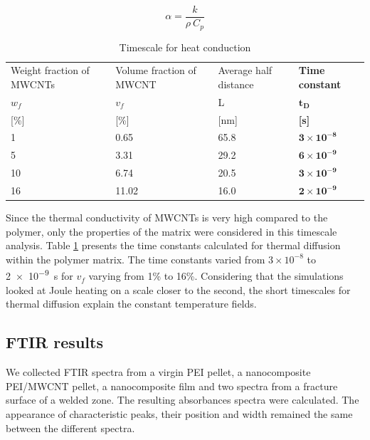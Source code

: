 \documentclass[11pt,review,times]{elsarticle}
\begin{document}
\begin{equation}
	\alpha = \frac{k}{\rho \ C_p}
	\label{equa:thermal_diffusivity}
\end{equation}

\begin{table}[htb]
\centering
\begin{tabular}{@{}p{2.4cm}p{2.5cm}p{2cm}p{1.5cm}@{}}
\toprule
Weight fraction of MWCNTs	& Volume fraction of MWCNT	& Average half distance 	& \textbf{Time constant}  		\\ %
$w_f$								& $v_f$ 							& L 							& $\mathbf{t_D}$            	\\
{[}\%{]}							& {[}\%{]	}						& {[}nm{]} 					& \textbf{{[}s{]}}            	\\ \midrule
1									& 0.65 							& 65.8	 						& $\mathbf{3\times 10^{-8}}$ 	\\ 
5									& 3.31								& 29.2							& $\mathbf{6\times 10^{-9}}$	\\
10									& 6.74								& 20.5							& $\mathbf{3\times 10^{-9}}$	\\
16									& 11.02 							& 16.0 						& $\mathbf{2\times 10^{-9}}$	\\	\bottomrule
\end{tabular}%
\caption{Timescale for heat conduction}
\label{tab:results_timescale}
\end{table}

Since the thermal conductivity of MWCNTs is very high compared to the polymer, only the properties of the matrix were considered in this timescale analysis. 
Table \ref{tab:results_timescale} presents the time constants calculated for thermal diffusion within the polymer matrix. 
The time constants varied from $3 \times 10^{-8}$ to \SI{2e-9}{\second} for $v_f$ varying from 1\% to 16\%. 
Considering that the simulations looked at Joule heating on a scale closer to the second, the short timescales for thermal diffusion explain the constant temperature fields. 

\subsection*{FTIR results}

We collected FTIR spectra from a virgin PEI pellet, a nanocomposite PEI/MWCNT pellet, a nanocomposite film and two spectra from a fracture surface of a welded zone. 
The resulting absorbances spectra were calculated. 
The appearance of characteristic peaks, their position and width remained the same between the different spectra. 
\end{document}
